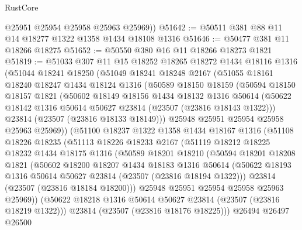 \begin{lexlean}{RustCore}
\begin{coremodule}
        @25951
        @25954
        @25958
        @25963
        @25969))
@51642 := @50511 @381 @88 @11 @14 @18277 @1322 @1358 @1434 @18108 @1316
@51646 := @50477 @381 @11 @18266 @18275
@51652 := @50550 @380 @16 @11 @18266 @18273 @1821
@51819 := @51033
    @307
    @11
    @15
    @18252
    @18265
    @18272
    @1434
    @18116
    @1316
    (@51044
      @18241
      @18250
      (@51049
        @18241
        @18248
        @2167
        (@51055
          @18161
          @18240
          @18247
          @1434
          @18124
          @1316
          (@50589
            @18150
            @18159
            (@50594
              @18150
              @18157
              @1821
              (@50602
                @18149
                @18156
                @1434
                @18132
                @1316
                @50614
                (@50622 @18142 @1316 @50614 @50627 @23814 (@23507 (@23816 @18143 @1322)))
                @23814
                (@23507 (@23816 @18133 @18149)))
              @25948
              @25951
              @25954
              @25958
              @25963
              @25969))
          (@51100
            @18237
            @1322
            @1358
            @1434
            @18167
            @1316
            (@51108
              @18226
              @18235
              (@51113
                @18226
                @18233
                @2167
                (@51119
                  @18212
                  @18225
                  @18232
                  @1434
                  @18175
                  @1316
                  (@50589
                    @18201
                    @18210
                    (@50594
                      @18201
                      @18208
                      @1821
                      (@50602
                        @18200
                        @18207
                        @1434
                        @18183
                        @1316
                        @50614
                        (@50622 @18193 @1316 @50614 @50627 @23814 (@23507 (@23816 @18194 @1322)))
                        @23814
                        (@23507 (@23816 @18184 @18200)))
                      @25948
                      @25951
                      @25954
                      @25958
                      @25963
                      @25969))
                  (@50622 @18218 @1316 @50614 @50627 @23814 (@23507 (@23816 @18219 @1322)))
                  @23814
                  (@23507 (@23816 @18176 @18225)))
                @26494
                @26497
                @26500

\end{coremodule}
\end{lexlean}
